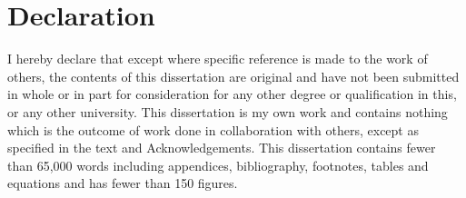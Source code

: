 \chapter*{Declaration}

I hereby declare that except where specific reference is made to the work of others, the contents of this dissertation are original and have not been submitted in whole or in part for consideration for any other degree or qualification in this, or any other university. This dissertation is my own work and contains nothing which is the outcome of work done in collaboration with others, except as specified in the text and Acknowledgements. This dissertation contains fewer than 65,000 words including appendices, bibliography, footnotes, tables and equations and has fewer than 150 figures.

